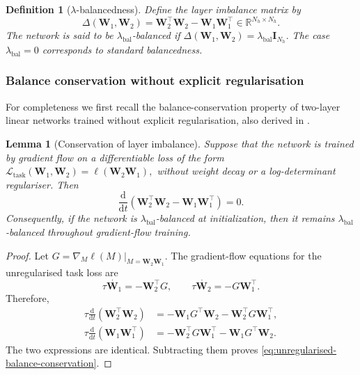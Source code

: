 \documentclass{article} %
\newcommand{\wa}{\mathbf{W}_1}
\newcommand{\wb}{\mathbf{W}_2}
\newtheorem{lemma}[theorem]{Lemma}
\newtheorem{definition}[theorem]{Definition}
\theoremstyle{remark}
\begin{document}
\begin{definition}[\(\lambda\)-balancedness]
\label{def:lambda-balanced}
Define the layer imbalance matrix by
\begin{equation}
\Delta(\wa,\wb)
=
\wb^\top\wb-\wa\wa^\top
\in\mathbb{R}^{N_h\times N_h}.
\label{eq:imbalance-definition}
\end{equation}
The network is said to be \(\lambda_{\mathrm{bal}}\)-balanced if
$\Delta(\wa,\wb)=\lambda_{\mathrm{bal}}\mathbf{I}_{N_h}.$
The case \(\lambda_{\mathrm{bal}}=0\) corresponds to standard
balancedness.
\end{definition}

\subsubsection{Balance conservation without explicit regularisation}

For completeness we first recall the balance-conservation property of two-layer linear
networks trained without explicit regularisation, also derived in \cite{dominé2024lazyrichexactlearning}.

\begin{lemma}[Conservation of layer imbalance]
\label{lem:unregularised-balance-conservation}
Suppose that the network is trained by gradient flow on a
differentiable loss of the form
$ \mathcal{L}_{\mathrm{task}}(\wa,\wb) = \ell(\wb\wa),$
without weight decay or a log-determinant regulariser. Then
\begin{equation}
\frac{\mathrm{d}}{\mathrm{d}t}
\left(
    \wb^\top\wb-\wa\wa^\top
\right)
=
0.
\label{eq:unregularised-balance-conservation}
\end{equation}
Consequently, if the network is
\(\lambda_{\mathrm{bal}}\)-balanced at initialization, then it remains
\(\lambda_{\mathrm{bal}}\)-balanced throughout gradient-flow training.
\end{lemma}

\begin{proof}
Let
$
G
=
\nabla_M\ell(M)\big|_{M=\wb\wa}.
$
The gradient-flow equations for the unregularised task loss are
\[
\tau\dot{\wa}
=
-\wb^\top G,
\qquad
\tau\dot{\wb}
=
-G\wa^\top.
\]
Therefore,
\begin{align}
\tau\frac{\mathrm{d}}{\mathrm{d}t}
\left(\wb^\top\wb\right)
&=
-\wa G^\top\wb
-\wb^\top G\wa^\top,
\\
\tau\frac{\mathrm{d}}{\mathrm{d}t}
\left(\wa\wa^\top\right)
&=
-\wb^\top G\wa^\top
-\wa G^\top\wb.
\end{align}
The two expressions are identical. Subtracting them proves
\eqref{eq:unregularised-balance-conservation}.
\end{proof}
\end{document}
